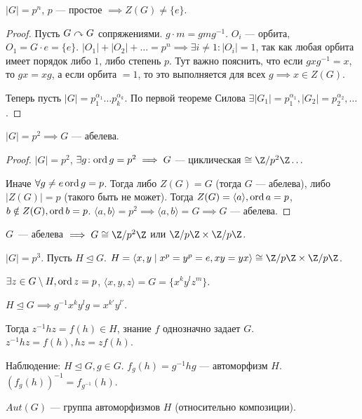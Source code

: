 \begin{lemma}
    $|G| = p^n$,  $p$ --- простое  $\implies Z(G) \neq \{e\}$.
\end{lemma}
\begin{proof}
    Пусть $G \curvearrowright G$ сопряжениями. $g \cdot m = g m g^{-1}$.   $O_i$ --- орбита,  $O_1 = G \cdot e = \{e\}$.  $|O_1| + |O_2| + \ldots = p^n \implies \exists i \neq 1\!: |O_i| = 1$, так как любая орбита имеет порядок либо $1$, либо степень $p$. Тут важно пояснить, что если $gxg^{-1} = x$, то  $gx = xg$, а если орбита  $=1$, то это выполняется для всех  $g \implies x\in Z(G)$.

    Теперь пусть $|G| = p_1^{\alpha_1} \ldots p_k^{\alpha_k}$. По первой теореме Силова $\exists |G_1| = p_1^{\alpha_1}, |G_2| = p_2^{\alpha_2}, \ldots$.
\end{proof}
\begin{theorem}
    $|G| = p^2 \implies G$ --- абелева.
\end{theorem}
\begin{proof}
    $|G| = p^2$,  $\exists g\!: \operatorname{ord} g =p^2 \implies G$ --- циклическая  $\cong \Z / p^2 \Z \ldots$

    Иначе $\forall g \neq e \operatorname{ord} g = p$.  Тогда либо $Z(G) = G$ (тогда $G$ --- абелева), либо $|Z(G)| = p$ (такого быть не может). Тогда  $Z(G) = \langle a \rangle, \operatorname{ord} a = p$,  $b \notin Z(G), \operatorname{ord} b = p$.  $\langle a, b\rangle = p^2 \implies \langle a, b \rangle = G \implies G$ --- абелева.
\end{proof}
\begin{remark}
    $G$~--- абелева $\implies G \cong \Z / p^2 \Z$ или $\Z / p \Z \times \Z / p \Z$.
\end{remark}
\begin{example}
    $|G| = p^3$.
    Пусть $H \trianglelefteq G$.  $H = \langle x, y \mid x^p = y^p = e, xy=yx\rangle \cong \Z / p\Z \times \Z / p\Z$.

     $\exists z \in G \setminus H, \operatorname{ord} z = p$, $\langle x, y, z\rangle = G = \{ x^k y^l z^m \}$.

     $H \trianglelefteq G \implies g^{-1}x^{k}y^{l}g = x^{k'}y^{l'}$.

     Тогда $z^{-1}hz = f(h) \in H$, знание  $f$ однозначно задает  $G$.  $z^{-1}hz = f(h), hz = zf(h)$.

     Наблюдение: $H \trianglelefteq G, g \in G$.  $f_g(h) = g^{-1}hg$ --- автоморфизм  $H$. $(f_g(h))^{-1} = f_{g^{-1}}(h)$.
\end{example}
\begin{definition}
    $Aut(G)$ --- группа автоморфизмов  $H$ (относительно композиции).
\end{definition}
